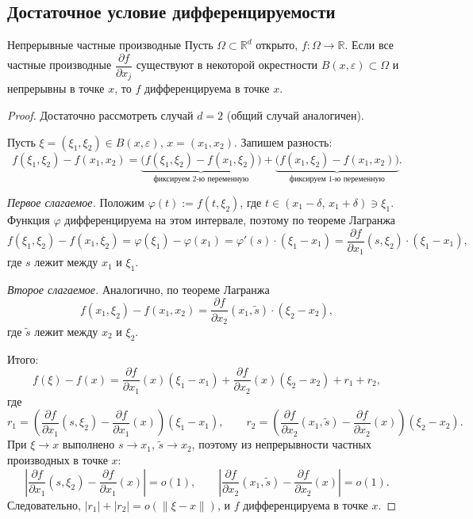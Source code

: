 \subsection{Достаточное условие дифференцируемости}

\begin{Theorem}{Непрерывные частные производные}{}
	Пусть $\Omega\subset\mathbb{R}^d$ открыто, $f\colon\Omega\to\mathbb{R}$.
	Если все частные производные $\dfrac{\partial f}{\partial x_j}$ существуют
	в некоторой окрестности $B(x,\varepsilon)\subset\Omega$ и непрерывны в точке $x$,
	то $f$ дифференцируема в точке $x$.
\end{Theorem}

\begin{proof}
	Достаточно рассмотреть случай $d=2$ (общий случай аналогичен).
	
	Пусть $\xi=(\xi_1,\xi_2)\in B(x,\varepsilon)$, $x=(x_1,x_2)$. Запишем разность:
	\[
	f(\xi_1,\xi_2)-f(x_1,x_2)
	=
	\underbrace{\bigl(f(\xi_1,\xi_2)-f(x_1,\xi_2)\bigr)}_{\text{фиксируем 2-ю переменную}}
	+
	\underbrace{\bigl(f(x_1,\xi_2)-f(x_1,x_2)\bigr)}_{\text{фиксируем 1-ю переменную}}.
	\]
	
	\textit{Первое слагаемое.} Положим $\varphi(t):=f(t,\xi_2)$, где $t\in(x_1-\delta,\,x_1+\delta)\ni\xi_1$.
	Функция $\varphi$ дифференцируема на этом интервале, поэтому по теореме Лагранжа
	\[
	f(\xi_1,\xi_2)-f(x_1,\xi_2)
	=\varphi(\xi_1)-\varphi(x_1)
	=\varphi'(s)\cdot(\xi_1-x_1)
	=\frac{\partial f}{\partial x_1}(s,\xi_2)\cdot(\xi_1-x_1),
	\]
	где $s$ лежит между $x_1$ и $\xi_1$.
	
	\textit{Второе слагаемое.} Аналогично, по теореме Лагранжа
	\[
	f(x_1,\xi_2)-f(x_1,x_2)
	=\frac{\partial f}{\partial x_2}(x_1,\tilde{s})\cdot(\xi_2-x_2),
	\]
	где $\tilde{s}$ лежит между $x_2$ и $\xi_2$.
	
	Итого:
	\[
	f(\xi)-f(x)
	=
	\frac{\partial f}{\partial x_1}(x)(\xi_1-x_1)
	+\frac{\partial f}{\partial x_2}(x)(\xi_2-x_2)
	+r_1+r_2,
	\]
	где
	\[
	r_1=
	\left(\frac{\partial f}{\partial x_1}(s,\xi_2)
	-\frac{\partial f}{\partial x_1}(x)\right)(\xi_1-x_1),
	\qquad
	r_2=
	\left(\frac{\partial f}{\partial x_2}(x_1,\tilde{s})
	-\frac{\partial f}{\partial x_2}(x)\right)(\xi_2-x_2).
	\]
	При $\xi\to x$ выполнено $s\to x_1$, $\tilde{s}\to x_2$, поэтому из непрерывности
	частных производных в точке $x$:
	\[
	\left|\frac{\partial f}{\partial x_1}(s,\xi_2)-\frac{\partial f}{\partial x_1}(x)\right|
	=o(1),
	\qquad
	\left|\frac{\partial f}{\partial x_2}(x_1,\tilde{s})-\frac{\partial f}{\partial x_2}(x)\right|
	=o(1).
	\]
	Следовательно, $|r_1|+|r_2|=o(\|\xi-x\|)$, и $f$ дифференцируема в точке $x$.
\end{proof}

